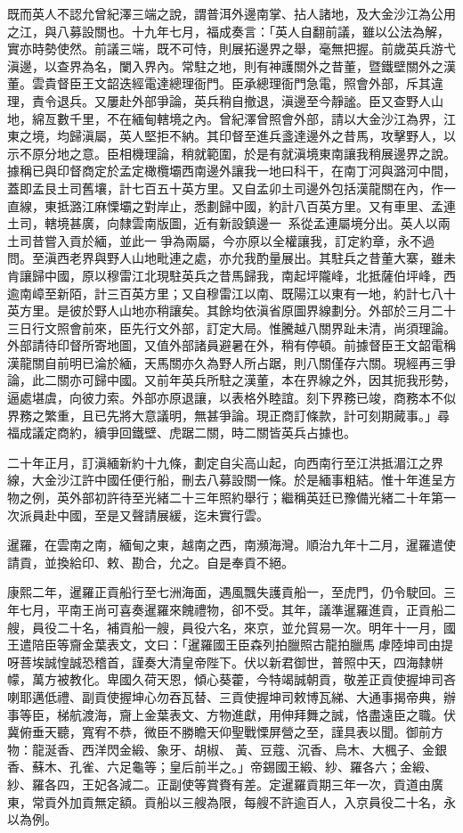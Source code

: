 \begin{pinyinscope}
既而英人不認允曾紀澤三端之說，謂普洱外邊南掌、拈人諸地，及大金沙江為公用之江，與八募設關也。十九年七月，福成奏言：「英人自翻前議，雖以公法為解，實亦時勢使然。前議三端，既不可恃，則展拓邊界之舉，毫無把握。前歲英兵游弋滇邊，以查界為名，闌入界內。常駐之地，則有神護關外之昔董，暨鐵壁關外之漢董。雲貴督臣王文韶迭經電達總理衙門。臣承總理衙門急電，照會外部，斥其違理，責令退兵。又屢赴外部爭論，英兵稍自撤退，滇邊至今靜謐。臣又查野人山地，綿亙數千里，不在緬甸轄境之內。曾紀澤曾照會外部，請以大金沙江為界，江東之境，均歸滇屬，英人堅拒不納。其印督至進兵盞達邊外之昔馬，攻擊野人，以示不原分地之意。臣相機理論，稍就範圍，於是有就滇境東南讓我稍展邊界之說。據稱已與印督商定於孟定橄欖壩西南邊外讓我一地曰科干，在南丁河與潞河中間，蓋即孟艮土司舊壤，計七百五十英方里。又自孟卯土司邊外包括漢龍關在內，作一直線，東抵潞江麻慄壩之對岸止，悉劃歸中國，約計八百英方里。又有車里、孟連土司，轄境甚廣，向隸雲南版圖，近有新設鎮邊一，系從孟連屬境分出。英人以兩土司昔嘗入貢於緬，並此一爭為兩屬，今亦原以全權讓我，訂定約章，永不過問。至滇西老界與野人山地毗連之處，亦允我酌量展出。其駐兵之昔董大寨，雖未肯讓歸中國，原以穆雷江北現駐英兵之昔馬歸我，南起坪隴峰，北抵薩伯坪峰，西逾南嶂至新陌，計三百英方里；又自穆雷江以南、既陽江以東有一地，約計七八十英方里。是彼於野人山地亦稍讓矣。其餘均依滇省原圖界線劃分。外部於三月二十三日行文照會前來，臣先行文外部，訂定大局。惟騰越八關界趾未清，尚須理論。外部請待印督所寄地圖，又值外部諸員避暑在外，稍有停頓。前據督臣王文韶電稱漢龍關自前明已淪於緬，天馬關亦久為野人所占踞，則八關僅存六關。現經再三爭論，此二關亦可歸中國。又前年英兵所駐之漢董，本在界線之外，因其扼我形勢，逼處堪虞，向彼力索。外部亦原退讓，以表格外睦誼。刻下界務已竣，商務本不似界務之繁重，且已先將大意議明，無甚爭論。現正商訂條款，計可刻期蕆事。」尋福成議定商約，續爭回鐵壁、虎踞二關，時二關皆英兵占據也。

二十年正月，訂滇緬新約十九條，劃定自尖高山起，向西南行至江洪抵湄江之界線，大金沙江許中國任便行船，刪去八募設關一條。於是緬事粗結。惟十年進呈方物之例，英外部初許待至光緒二十三年照約舉行；繼稱英廷已豫備光緒二十年第一次派員赴中國，至是又聲請展緩，迄未實行雲。

暹羅，在雲南之南，緬甸之東，越南之西，南瀕海灣。順治九年十二月，暹羅遣使請貢，並換給印、敕、勘合，允之。自是奉貢不絕。

康熙二年，暹羅正貢船行至七洲海面，遇風飄失護貢船一，至虎門，仍令駛回。三年七月，平南王尚可喜奏暹羅來餽禮物，卻不受。其年，議準暹羅進貢，正貢船二艘，員役二十名，補貢船一艘，員役六名，來京，並允貿易一次。明年十一月，國王遣陪臣等齎金葉表文，文曰：「暹羅國王臣森列拍臘照古龍拍臘馬虖陸坤司由提呀菩埃誠惶誠恐稽首，謹奏大清皇帝陛下。伏以新君御世，普照中天，四海隸帡幪，萬方被教化。卑國久荷天恩，傾心葵藿，今特竭誠朝貢，敬差正貢使握坤司吝喇耶邁低禮、副貢使握坤心勿吞瓦替、三貢使握坤司敕博瓦綈、大通事揭帝典，辦事等臣，梯航渡海，齎上金葉表文、方物進獻，用伸拜舞之誠，恪盡遠臣之職。伏冀俯垂天聽，寬宥不恭，微臣不勝瞻天仰聖戰慄屏營之至，謹具表以聞。御前方物：龍涎香、西洋閃金緞、象牙、胡椒、黃、豆蔻、沉香、烏木、大楓子、金銀香、蘇木、孔雀、六足龜等；皇后前半之。」帝錫國王緞、紗、羅各六；金緞、紗、羅各四，王妃各減二。正副使等賞賚有差。定暹羅貢期三年一次，貢道由廣東，常貢外加貢無定額。貢船以三艘為限，每艘不許逾百人，入京員役二十名，永以為例。


\end{pinyinscope}
